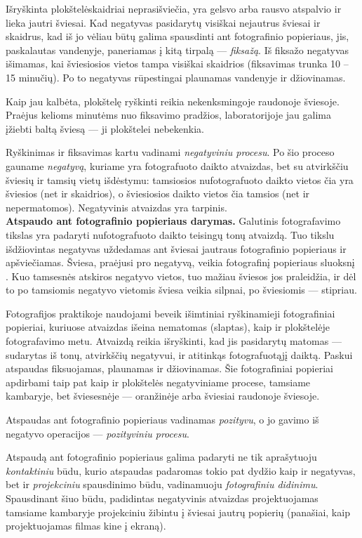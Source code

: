 \documentclass[12pt]{book}
\begin{document}
			Išryškinta plokštelėskaidriai neprasišviečia, yra gelsvo arba rausvo atspalvio ir lieka jautri šviesai. Kad negatyvas pasidarytų visiškai nejautrus šviesai ir skaidrus, kad iš jo vėliau būtų galima spausdinti ant fotografinio popieriaus, jis, paskalautas vandenyje, paneriamas į kitą tirpalą --- \textit{fiksažą}. Iš fiksažo negatyvas išimamas, kai šviesiosios vietos tampa visiškai skaidrios (fiksavimas trunka 10 -- 15 minučių). Po to negatyvas rūpestingai plaunamas vandenyje ir džiovinamas.

			Kaip jau kalbėta, plokštelę ryškinti reikia nekenksmingoje raudonoje šviesoje. Praėjus kelioms minutėms nuo fiksavimo pradžios, laboratorijoje jau galima įžiebti baltą šviesą --- ji plokštelei nebekenkia.

			Ryškinimas ir fiksavimas kartu vadinami \textit{negatyviniu procesu}. Po šio proceso gauname \textit{negatyvą}, kuriame yra fotografuoto daikto atvaizdas, bet su atvirkščiu šviesių ir tamsių vietų išdėstymu: tamsiosios nufotografuoto daikto vietos čia yra šviesios (net ir skaidrios), o šviesiosios daikto vietos čia tamsios (net ir nepermatomos). Negatyvinis atvaizdas yra tarpinis.\\

			\textbf{Atspaudo ant fotografinio popieriaus darymas.} Galutinis fotografavimo tikslas yra padaryti nufotografuoto daikto teisingų tonų atvaizdą. Tuo tikslu išdžiovintas negatyvas uždedamas ant šviesai jautraus fotografinio popieriaus ir apšviečiamas. Šviesa, praėjusi pro negatyvą, veikia fotografinį popieriaus sluoksnį . Kuo tamsesnės atskiros negatyvo vietos, tuo mažiau šviesos jos praleidžia, ir dėl to po tamsiomis negatyvo vietomis šviesa veikia silpnai, po šviesiomis --- stipriau.

			Fotografijos praktikoje naudojami beveik išimtiniai ryškinamieji fotografiniai popieriai, kuriuose atvaizdas išeina nematomas (slaptas), kaip ir plokštelėje fotografavimo metu. Atvaizdą reikia išryškinti, kad jis pasidarytų matomas --- sudarytas iš tonų, atvirkščių negatyvui, ir atitinkąs fotografuotąjį daiktą. Paskui atspaudas fiksuojamas, plaunamas ir džiovinamas. Šie fotografiniai popieriai apdirbami taip pat kaip ir plokštelės negatyviniame procese, tamsiame kambaryje, bet šviesesnėje --- oranžinėje arba šviesiai raudonoje šviesoje.

			Atspaudas ant fotografinio popieriaus vadinamas \textit{pozityvu}, o jo gavimo iš negatyvo operacijos --- \textit{pozityviniu procesu}.

			Atspaudą ant fotografinio popieriaus galima padaryti ne tik aprašytuoju \textit{kontaktiniu} būdu, kurio atspaudas padaromas tokio pat dydžio kaip ir negatyvas, bet ir \textit{projekciniu} spausdinimo būdu, vadinamuoju \textit{fotografiniu didinimu}. Spausdinant šiuo būdu, padidintas negatyvinis atvaizdas projektuojamas tamsiame kambaryje projekciniu žibintu į šviesai jautrų popierių (panašiai, kaip projektuojamas filmas kine į ekraną).
\end{document}
